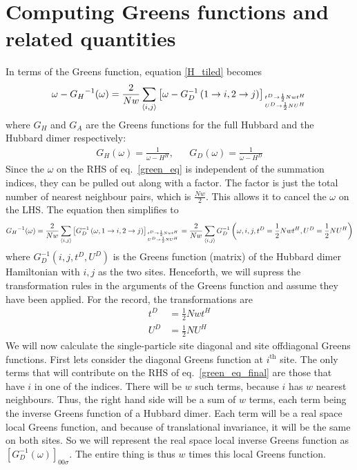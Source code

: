 \documentclass[12pt]{article}
\numberwithin{equation}{section}
\begin{document}
\section{Computing Greens functions and related quantities}
In terms of the Greens function, equation \ref{H_tiled} becomes
\begin{equation}\begin{aligned}
	\label{green_eq}
	\omega - {G_H}^{-1}(\omega) = \frac{2}{Nw}\sum_{\left<i,j\right>}\left[\omega - G_D^{-1}\left(1 \to i, 2 \to j\right)\right]_{t^D \to \frac{1}{2}Nwt^H \atop{U^D \to \frac{1}{2}N U^H}}
\end{aligned}\end{equation}
where $G_H$ and $G_A$ are the Greens functions for the full Hubbard and the Hubbard dimer respectively:
\begin{equation}\begin{aligned}
	G_H(\omega) = \frac{1}{\omega - H^H}, && G_D(\omega) = \frac{1}{\omega - H^D}
\end{aligned}\end{equation}
Since the $\omega$ on the RHS of eq.~\ref{green_eq} is independent of the summation indices, they can be pulled out along with a factor. The factor is just the total number of nearest neighbour pairs, which is $\frac{Nw}{2}$. This allows it to cancel the $\omega$ on the LHS. The equation then simplifies to
\begin{equation}\begin{aligned}
	\label{green_eq_final}
{G_H}^{-1}(\omega) = \frac{2}{Nw}\sum_{\left<i,j\right>}\left[G_D^{-1}\left(\omega, 1 \to i, 2 \to j\right)\right]_{t^D \to \frac{1}{2}Nwt^H \atop{U^D \to \frac{1}{2}N U^H}} = \frac{2}{Nw}\sum_{\left<i,j\right>}G_D^{-1}\left(\omega, i, j, t^D = \frac{1}{2}Nwt^H, U^D = \frac{1}{2}N U^H\right)
\end{aligned}\end{equation}
where $G_D^{-1}(i,j,t^D,U^D)$ is the Greens function (matrix) of the Hubbard dimer Hamiltonian with $i, j$ as the two sites. Henceforth, we will supress the transformation rules in the arguments of the Greens function and assume they have been applied. For the record, the transformations are
\begin{equation}\begin{aligned}
	t^D &= \frac{1}{2}Nwt^H\\
	U^D &= \frac{1}{2}N U^H
\end{aligned}\end{equation}
We will now calculate the single-particle site diagonal and site offdiagonal Greens functions. First lets consider the diagonal Greens function at $i^\text{th}$ site. The only terms that will contribute on the RHS of eq.~\ref{green_eq_final} are those that have $i$ in one of the indices. There will be $w$ such terms, because $i$ has $w$ nearest neighbours. Thus, the right hand side will be a sum of $w$ terms, each term being the inverse Greens function of a Hubbard dimer. Each term will be a real space local Greens function, and because of translational invariance, it will be the same on both sites. So we will represent the real space local inverse Greens function as $\left[G_D^{-1}(\omega)\right]_{00\sigma}$. The entire thing is thus $w$ times this local Greens function.
\end{document}
